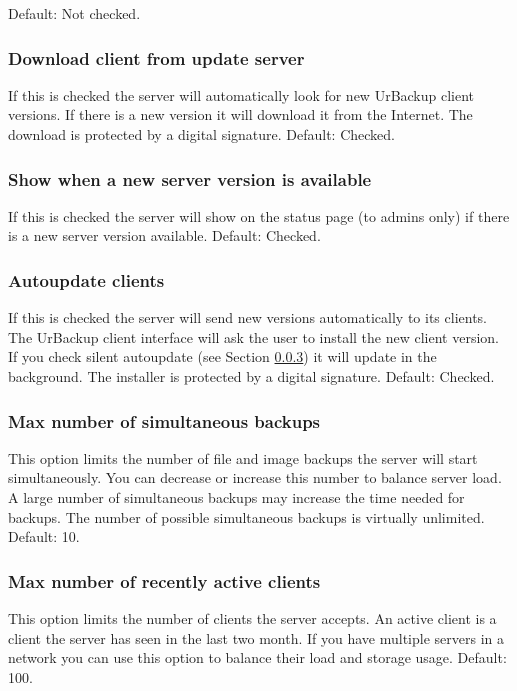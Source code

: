 \documentclass[a4paper,10pt]{article}
\begin{document}
Default: Not checked.

\subsubsection{Download client from update server}

If this is checked the server will automatically look for new UrBackup client
versions. If there is a new version it will download it from the Internet. The
download is protected by a digital signature. Default: Checked.

\subsubsection{Show when a new server version is available}

If this is checked the server will show on the status page (to admins only) if there is a new
server version available. Default: Checked.

\subsubsection{Autoupdate clients}
\label{subsubsec:autoupdate}

If this is checked the server will send new versions automatically to its clients.
The UrBackup client interface will ask the user to
install the new client version. If you check silent autoupdate (see Section \ref{subsubsec:autoupdate})
it will update in the background.
The installer is protected by a digital signature. Default: Checked.

\subsubsection{Max number of simultaneous backups}

This option limits the number of file and image backups the server will start
simultaneously. You can decrease or increase this number to balance server load. A
large number of simultaneous backups may increase the time needed for backups.
The number of possible simultaneous backups is virtually unlimited. Default: 10.

\subsubsection{Max number of recently active clients}

This option limits the number of clients the server accepts. An active client is
a client the server has seen in the last two month. If you have multiple servers
in a network you can use this option to balance their load and storage usage.
Default: 100.
\end{document}
